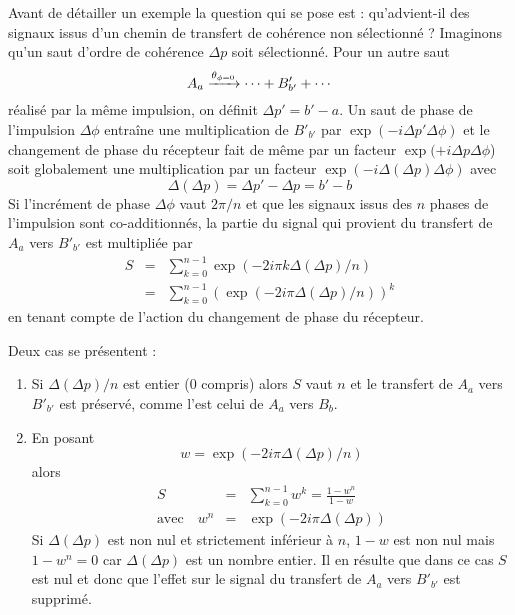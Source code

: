 Avant de détailler un exemple la question qui se pose est :
qu'advient-il des signaux issus d'un chemin de transfert de cohérence non sélectionné ?
Imaginons qu'un saut d'ordre de cohérence $\Delta p$ soit sélectionné.
Pour un autre saut
\begin{equation}
A_a \xrightarrow{\theta_{\phi=0}} \cdots + B'_{b'} + \cdots
\end{equation}
réalisé par la même impulsion, on définit $\Delta p' = b' - a$.
Un saut de phase de l'impulsion $\Delta\phi$ entraîne une multiplication de $B'_{b'}$ par
$\exp(-i\Delta p' \Delta\phi)$ et le changement de phase du récepteur fait de même
par un facteur $\exp(+i\Delta p \Delta\phi$) soit globalement une multiplication par
un facteur $\exp(-i\Delta(\Delta p) \Delta\phi)$ avec
\begin{equation}
\Delta(\Delta p) = \Delta p' - \Delta p = b' - b
\end{equation}
Si l'incrément de phase $\Delta\phi$ vaut $2\pi/n$ et que les signaux issus
des $n$ phases de l'impulsion sont co-additionnés, la partie du signal
qui provient du transfert de $A_a$ vers $B'_{b'}$ est multipliée par
\begin{eqnarray}
S & = & \sum_{k=0}^{n-1} \exp(-2i\pi k \Delta(\Delta p)/n) \\
& = & \sum_{k=0}^{n-1} \left(\exp(-2i\pi \Delta(\Delta p)/n)\right)^k
\end{eqnarray}
en tenant compte de l'action du changement de phase du récepteur.

Deux cas se présentent :
\begin{enumerate}
\item Si $\Delta(\Delta p)/n$ est entier (0 compris) alors $S$ vaut $n$ et le transfert de
$A_a$ vers $B'_{b'}$ est préservé, comme l'est celui de $A_a$ vers $B_b$.
\item En posant
\begin{equation}
w = \exp(-2i\pi \Delta(\Delta p)/n)
\end{equation}
alors
\begin{eqnarray}
S & = & \sum_{k=0}^{n-1} w^k = \frac{1-w^n}{1-w} \\
\mbox{avec}\quad w^n & = & \exp(-2i\pi \Delta(\Delta p))
\end{eqnarray}
Si $\Delta(\Delta p)$ est non nul et strictement inférieur à $n$, $1-w$ est non nul
mais $1-w^n = 0$ car $\Delta(\Delta p)$ est un nombre entier.
Il en résulte que dans ce cas $S$ est nul et donc que l'effet sur le signal
du transfert de $A_a$ vers $B'_{b'}$ est supprimé.
\end{enumerate}

